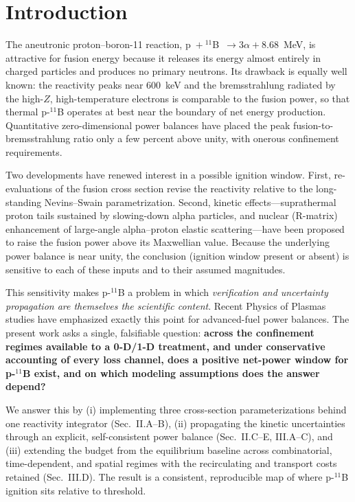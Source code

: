 \documentclass[aip,pop,reprint,amsmath,amssymb,floatfix]{revtex4-2}
\begin{document}
\maketitle

\section{Introduction}

The aneutronic proton--boron-11 reaction, p~$+~^{11}$B~$\to 3\alpha + 8.68$~MeV, is attractive for fusion energy because it releases its energy almost entirely in charged particles and produces no primary neutrons. Its drawback is equally well known: the reactivity peaks near 600~keV and the bremsstrahlung radiated by the high-$Z$, high-temperature electrons is comparable to the fusion power, so that thermal p-$^{11}$B operates at best near the boundary of net energy production. Quantitative zero-dimensional power balances\cite{put1} have placed the peak fusion-to-bremsstrahlung ratio only a few percent above unity, with onerous confinement requirements.

Two developments have renewed interest in a possible ignition window. First, re-evaluations of the fusion cross section\cite{tb,wang} revise the reactivity relative to the long-standing Nevins--Swain parametrization\cite{ns}. Second, kinetic effects---suprathermal proton tails sustained by slowing-down alpha particles, and nuclear (R-matrix) enhancement of large-angle alpha--proton elastic scattering\cite{belloni}---have been proposed to raise the fusion power above its Maxwellian value. Because the underlying power balance is near unity, the conclusion (ignition window present or absent) is sensitive to each of these inputs and to their assumed magnitudes.

This sensitivity makes p-$^{11}$B a problem in which \textit{verification and uncertainty propagation are themselves the scientific content}. Recent Physics of Plasmas studies have emphasized exactly this point for advanced-fuel power balances\cite{poprecent}. The present work asks a single, falsifiable question: \textbf{across the confinement regimes available to a 0-D/1-D treatment, and under conservative accounting of every loss channel, does a positive net-power window for p-$^{11}$B exist, and on which modeling assumptions does the answer depend?}

We answer this by (i) implementing three cross-section parameterizations behind one reactivity integrator (Sec.~II.A--B), (ii) propagating the kinetic uncertainties through an explicit, self-consistent power balance (Sec.~II.C--E, III.A--C), and (iii) extending the budget from the equilibrium baseline across combinatorial, time-dependent, and spatial regimes with the recirculating and transport costs retained (Sec.~III.D). The result is a consistent, reproducible map of where p-$^{11}$B ignition sits relative to threshold.
\end{document}
